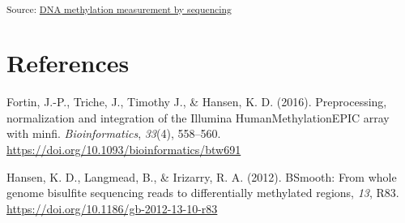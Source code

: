 \documentclass[
]{agujournal2019}
\newlength{\cslhangindent}
\newenvironment{CSLReferences}[2] %
 {\begin{list}{}{%
  \setlength{\itemindent}{0pt}
  \setlength{\leftmargin}{0pt}
  \setlength{\parsep}{0pt}
  \ifodd #1
   \setlength{\leftmargin}{\cslhangindent}
   \setlength{\itemindent}{-1\cslhangindent}
  \fi
  \setlength{\itemsep}{#2\baselineskip}}}
 {\end{list}}
\begin{document}
\begin{figure}[H]


\caption{\label{fig-dmr}}

\end{figure}%

\textsubscript{Source:
\href{https://pipaber.github.io/Epigenomics/notebooks/Methyl_Seq-preview.html\#cell-fig-dmr}{DNA
methylation measurement by sequencing}}

\section*{References}\label{references}

\label{refs}
\begin{CSLReferences}{1}{0}
\vspace{1em}

Fortin, J.-P., Triche, J., Timothy J., \& Hansen, K. D. (2016).
{Preprocessing, normalization and integration of the Illumina
HumanMethylationEPIC array with minfi}. \emph{Bioinformatics},
\emph{33}(4), 558--560.
\url{https://doi.org/10.1093/bioinformatics/btw691}

Hansen, K. D., Langmead, B., \& Irizarry, R. A. (2012).
{\textbraceleft}BSmooth: From whole genome bisulfite sequencing reads to
differentially methylated regions{\textbraceright}, \emph{13}, R83.
\url{https://doi.org/10.1186/gb-2012-13-10-r83}

\end{CSLReferences}
\end{document}
